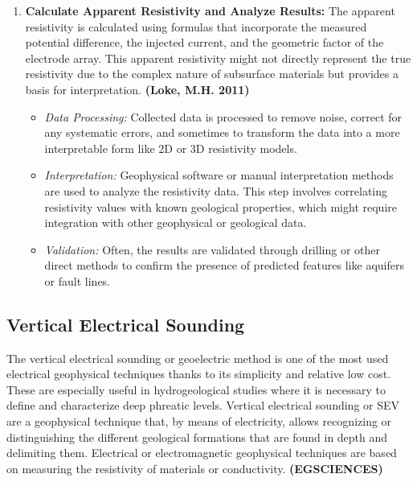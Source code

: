\documentclass[12pt,a4paper]{report}
\begin{document}
\begin{enumerate}
    \item \textbf{Calculate Apparent Resistivity and Analyze Results:} The apparent resistivity is calculated using formulas that incorporate the measured potential difference, the injected current, and the geometric factor of the electrode array. This apparent resistivity might not directly represent the true resistivity due to the complex nature of subsurface materials but provides a basis for interpretation. \textbf{(Loke, M.H. 2011)}
    \begin{itemize}
        \item \textit{Data Processing:} Collected data is processed to remove noise, correct for any systematic errors, and sometimes to transform the data into a more interpretable form like 2D or 3D resistivity models.
        \item \textit{Interpretation:} Geophysical software or manual interpretation methods are used to analyze the resistivity data. This step involves correlating resistivity values with known geological properties, which might require integration with other geophysical or geological data.
        \item \textit{Validation:} Often, the results are validated through drilling or other direct methods to confirm the presence of predicted features like aquifers or fault lines.
    \end{itemize}
\end{enumerate}

\subsection{Vertical Electrical Sounding}
The vertical electrical sounding or geoelectric method is one of the most used electrical geophysical techniques thanks to its simplicity and relative low cost. These are especially useful in hydrogeological studies where it is necessary to define and characterize deep phreatic levels. Vertical electrical sounding or SEV are a geophysical technique that, by means of electricity, allows recognizing or distinguishing the different geological formations that are found in depth and delimiting them. Electrical or electromagnetic geophysical techniques are based on measuring the resistivity of materials or conductivity. \textbf{(EGSCIENCES)}
\end{document}
